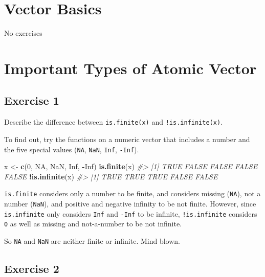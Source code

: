 \documentclass[]{book}
\newenvironment{Shaded}{\begin{snugshade}}{\end{snugshade}}
\newcommand{\CommentTok}[1]{\textcolor[rgb]{0.56,0.35,0.01}{\textit{#1}}}
\newcommand{\DecValTok}[1]{\textcolor[rgb]{0.00,0.00,0.81}{#1}}
\newcommand{\KeywordTok}[1]{\textcolor[rgb]{0.13,0.29,0.53}{\textbf{#1}}}
\newcommand{\NormalTok}[1]{#1}
\newcommand{\OperatorTok}[1]{\textcolor[rgb]{0.81,0.36,0.00}{\textbf{#1}}}
\newcommand{\OtherTok}[1]{\textcolor[rgb]{0.56,0.35,0.01}{#1}}
\newcommand{\StringTok}[1]{\textcolor[rgb]{0.31,0.60,0.02}{#1}}
\theoremstyle{definition}
\theoremstyle{definition}
\theoremstyle{definition}
\theoremstyle{remark}
\begin{document}
\hypertarget{vector-basics}{%
\section{Vector Basics}\label{vector-basics}}

No exercises

\hypertarget{important-types-of-atomic-vector}{%
\section{Important Types of Atomic
Vector}\label{important-types-of-atomic-vector}}

\hypertarget{exercise-1-48}{%
\subsection{Exercise 1}\label{exercise-1-48}}

Describe the difference between \texttt{is.finite(x)} and
\texttt{!is.infinite(x)}.

To find out, try the functions on a numeric vector that includes a
number and the five special values (\texttt{NA}, \texttt{NaN},
\texttt{Inf}, \texttt{-Inf}).

\begin{Shaded}
\begin{Highlighting}[]
\NormalTok{x <-}\StringTok{ }\KeywordTok{c}\NormalTok{(}\DecValTok{0}\NormalTok{, }\OtherTok{NA}\NormalTok{, }\OtherTok{NaN}\NormalTok{, }\OtherTok{Inf}\NormalTok{, }\OperatorTok{-}\OtherTok{Inf}\NormalTok{)}
\KeywordTok{is.finite}\NormalTok{(x)}
\CommentTok{#> [1]  TRUE FALSE FALSE FALSE FALSE}
\OperatorTok{!}\KeywordTok{is.infinite}\NormalTok{(x)}
\CommentTok{#> [1]  TRUE  TRUE  TRUE FALSE FALSE}
\end{Highlighting}
\end{Shaded}

\texttt{is.finite} considers only a number to be finite, and considers
missing (\texttt{NA}), not a number (\texttt{NaN}), and positive and
negative infinity to be not finite. However, since \texttt{is.infinite}
only considers \texttt{Inf} and \texttt{-Inf} to be infinite,
\texttt{!is.infinite} considers \texttt{0} as well as missing and
not-a-number to be not infinite.

So \texttt{NA} and \texttt{NaN} are neither finite or infinite. Mind
blown.

\hypertarget{exercise-2-47}{%
\subsection{Exercise 2}\label{exercise-2-47}}
\end{document}
